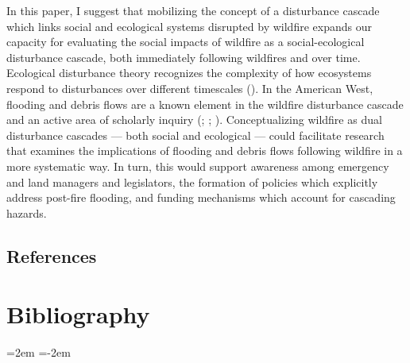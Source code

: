 \documentclass[
]{article}
\begin{document}
In this paper, I suggest that mobilizing the concept of a disturbance cascade which links social and ecological systems disrupted by wildfire expands our capacity for evaluating the social impacts of wildfire as a social-ecological disturbance cascade, both immediately following wildfires and over time. Ecological disturbance theory recognizes the complexity of how ecosystems respond to disturbances over different timescales (). In the American West, flooding and debris flows are a known element in the wildfire disturbance cascade and an active area of scholarly inquiry (; ; ). Conceptualizing wildfire as dual disturbance cascades --- both social and ecological --- could facilitate research that examines the implications of flooding and debris flows following wildfire in a more systematic way. In turn, this would support awareness among emergency and land managers and legislators, the formation of policies which explicitly address post-fire flooding, and funding mechanisms which account for cascading hazards.

\subsection{References}\label{references-1}

\section*{Bibliography}

\noindent
\leftskip=2em
\parindent=-2em
\end{document}
